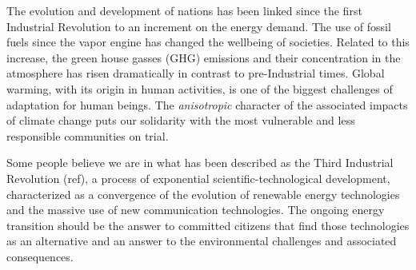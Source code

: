 
The evolution and development of nations has been linked since the first Industrial Revolution to an increment on the energy demand. The use of fossil fuels since the vapor engine has changed the wellbeing of societies. Related to this increase, the green house gasses (GHG) emissions and their concentration in the atmosphere has risen dramatically in contrast to pre-Industrial times. Global warming, with its origin in human activities, is one of the biggest challenges of adaptation for human beings. The \textit{anisotropic} character of the associated impacts of climate change puts our solidarity with the most vulnerable and less responsible communities on trial.


Some people believe we are in what has been described as the Third Industrial Revolution (ref), a process of exponential scientific-technological development, characterized as a convergence of the evolution of renewable energy technologies and the massive use of new communication technologies. The ongoing energy transition should be the answer to committed citizens that find those technologies as an alternative and an answer to the environmental challenges and associated consequences.     

